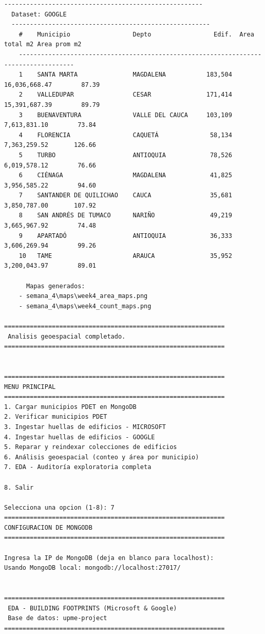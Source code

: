 \documentclass[12pt,a4paper]{article}
\begin{document}
\begin{lstlisting}[style=evidence]
  ------------------------------------------------------
  Dataset: GOOGLE
  ------------------------------------------------------
    #    Municipio                 Depto                 Edif.  Area total m2 Area prom m2
    -------------------------------------------------------------------------------------
    1    SANTA MARTA               MAGDALENA           183,504  16,036,668.47        87.39
    2    VALLEDUPAR                CESAR               171,414  15,391,687.39        89.79
    3    BUENAVENTURA              VALLE DEL CAUCA     103,109   7,613,831.10        73.84
    4    FLORENCIA                 CAQUETÁ              58,134   7,363,259.52       126.66
    5    TURBO                     ANTIOQUIA            78,526   6,019,578.12        76.66
    6    CIÉNAGA                   MAGDALENA            41,825   3,956,585.22        94.60
    7    SANTANDER DE QUILICHAO    CAUCA                35,681   3,850,787.00       107.92
    8    SAN ANDRÉS DE TUMACO      NARIÑO               49,219   3,665,967.92        74.48
    9    APARTADÓ                  ANTIOQUIA            36,333   3,606,269.94        99.26
    10   TAME                      ARAUCA               35,952   3,200,043.97        89.01

      Mapas generados:
    - semana_4\maps\week4_area_maps.png
    - semana_4\maps\week4_count_maps.png

============================================================
 Analisis geoespacial completado.
============================================================


============================================================
MENU PRINCIPAL
============================================================
1. Cargar municipios PDET en MongoDB
2. Verificar municipios PDET
3. Ingestar huellas de edificios - MICROSOFT
4. Ingestar huellas de edificios - GOOGLE
5. Reparar y reindexar colecciones de edificios
6. Análisis geoespacial (conteo y área por municipio)
7. EDA - Auditoría exploratoria completa

8. Salir

Selecciona una opcion (1-8): 7
============================================================
CONFIGURACION DE MONGODB
============================================================

Ingresa la IP de MongoDB (deja en blanco para localhost): 
Usando MongoDB local: mongodb://localhost:27017/


============================================================
 EDA - BUILDING FOOTPRINTS (Microsoft & Google)
 Base de datos: upme-project
============================================================


\end{lstlisting}
\end{document}
